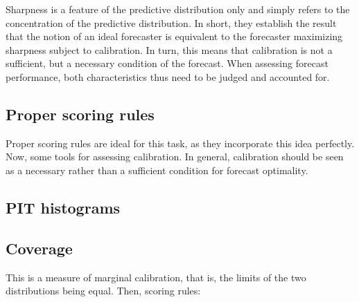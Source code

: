 Sharpness is a feature of the predictive distribution only and simply refers to the concentration of the predictive distribution. In short, they establish the result that the notion of an ideal forecaster is equivalent to the forecaster maximizing sharpness subject to calibration. In turn, this means that calibration is not a sufficient, but a necessary condition of the forecast. When assessing forecast performance, both characteristics thus need to be judged and accounted for.\\
\subsection{Proper scoring rules}
Proper scoring rules are ideal for this task, as they incorporate this idea perfectly.\\
Now, some tools for assessing calibration. In general, calibration should be seen as a necessary rather than a sufficient condition for forecast optimality.
\subsection{PIT histograms}
\subsection{Coverage}
This is a measure of marginal calibration, that is, the limits of the two distributions being equal.
Then, scoring rules:\\
